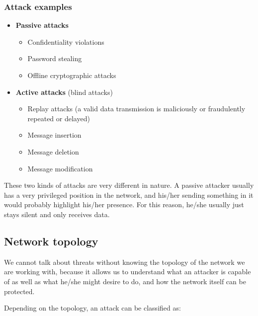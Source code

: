 \subsubsection{Attack examples}
\begin{itemize}

    \vspace{0.2em}
    
        \item \textbf{Passive attacks}
        \begin{itemize}
            \item Confidentiality violations
            \item Password stealing
            \item Offline cryptographic attacks
        \end{itemize}
        
    \vspace{0.2em}
        
    \item \textbf{Active attacks} (blind attacks)
        \begin{itemize}
            \item Replay attacks (a valid data transmission is maliciously or fraudulently repeated or delayed)
            \item Message insertion
            \item Message deletion
            \item Message modification
        \end{itemize}
\end{itemize}

These two kinds of attacks are very different in nature. A passive attacker usually has a very privileged position in the network, and his/her sending something in it would probably highlight his/her presence. For this reason, he/she usually just stays silent and only receives data.


\subsection{Network topology}
We cannot talk about threats without knowing the topology of the network we are working with, because it allows us to understand what an attacker is capable of as well as what he/she might desire to do, and how the network itself can be protected.

Depending on the topology, an attack can be classified as:

